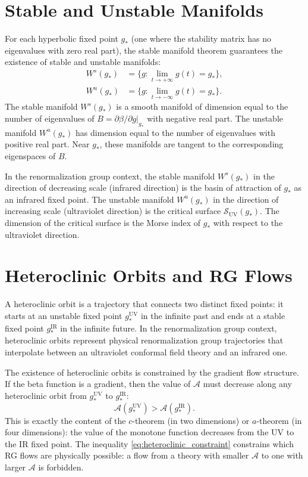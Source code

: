 \documentclass[11pt, twoside, openright]{book}
\theoremstyle{dotted}
\theoremstyle{definition}
\newcommand{\cS}{\mathcal{S}}          %
\newcommand{\UV}{\mathrm{UV}}          %
\newcommand{\IR}{\mathrm{IR}}          %
\begin{document}
\section{Stable and Unstable Manifolds}

For each hyperbolic fixed point $g_*$ (one where the stability matrix has no
eigenvalues with zero real part), the stable manifold theorem guarantees the
existence of stable and unstable manifolds:
\begin{align}
  W^s(g_*) &= \{g : \lim_{t\to+\infty}g(t) = g_*\}, \\
  W^u(g_*) &= \{g : \lim_{t\to-\infty}g(t) = g_*\}.
  \label{eq:stable_unstable}
\end{align}
The stable manifold $W^s(g_*)$ is a smooth manifold of dimension equal to the
number of eigenvalues of $B = \partial\beta/\partial g|_{g_*}$ with negative real
part. The unstable manifold $W^u(g_*)$ has dimension equal to the number of
eigenvalues with positive real part. Near $g_*$, these manifolds are tangent to
the corresponding eigenspaces of $B$.

In the renormalization group context, the stable manifold $W^s(g_*)$ in the
direction of decreasing scale (infrared direction) is the basin of attraction of
$g_*$ as an infrared fixed point. The unstable manifold $W^u(g_*)$ in the direction
of increasing scale (ultraviolet direction) is the critical surface $\cS_{\UV}(g_*)$.
The dimension of the critical surface is the Morse index of $g_*$ with respect to
the ultraviolet direction.

\section{Heteroclinic Orbits and RG Flows}

A heteroclinic orbit is a trajectory that connects two distinct fixed points: it
starts at an unstable fixed point $g_*^{\UV}$ in the infinite past and ends at a
stable fixed point $g_*^{\IR}$ in the infinite future. In the renormalization group
context, heteroclinic orbits represent physical renormalization group trajectories
that interpolate between an ultraviolet conformal field theory and an infrared one.

The existence of heteroclinic orbits is constrained by the gradient flow structure.
If the beta function is a gradient, then the value of $\mathcal{A}$ must decrease
along any heteroclinic orbit from $g_*^{\UV}$ to $g_*^{\IR}$:
\begin{equation}
  \mathcal{A}(g_*^{\UV}) > \mathcal{A}(g_*^{\IR}).
  \label{eq:heteroclinic_constraint}
\end{equation}
This is exactly the content of the $c$-theorem (in two dimensions) or $a$-theorem
(in four dimensions): the value of the monotone function decreases from the UV to
the IR fixed point. The inequality \eqref{eq:heteroclinic_constraint} constrains
which RG flows are physically possible: a flow from a theory with smaller $\mathcal{A}$
to one with larger $\mathcal{A}$ is forbidden.
\end{document}
